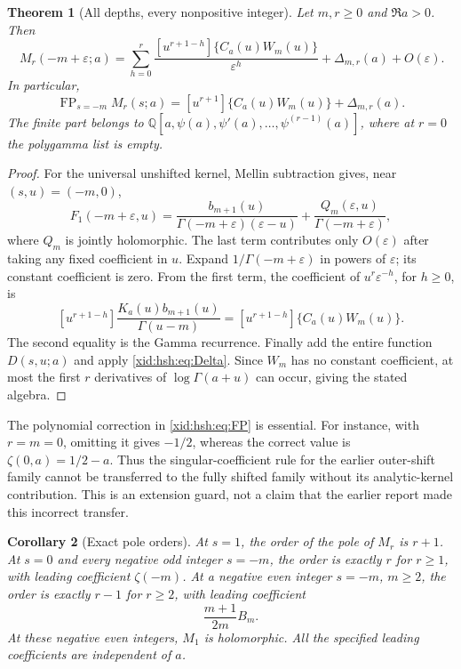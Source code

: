 \documentclass[11pt,a4paper]{article}
\numberwithin{equation}{section}
\newtheorem{theorem}{Theorem}[section]
\newtheorem{corollary}[theorem]{Corollary}
\theoremstyle{definition}
\theoremstyle{remark}
\begin{document}
\begin{theorem}[All depths, every nonpositive integer]
\label{xid:hsh:thm:Laurent}
Let $m,r\ge0$ and $\Re a>0$. Then
\begin{equation}\label{xid:hsh:eq:Laurent}
 \boxed{\quad
 M_r(-m+\varepsilon;a)=
 \sum_{h=0}^r
     \frac{[u^{r+1-h}]\{C_a(u)W_m(u)\}}{\varepsilon^h}
   +\Delta_{m,r}(a)+O(\varepsilon).
 \quad}
\end{equation}
In particular,
\begin{equation}\label{xid:hsh:eq:FP}
 \operatorname{FP}_{s=-m}M_r(s;a)
  =[u^{r+1}]\{C_a(u)W_m(u)\}+\Delta_{m,r}(a).
\end{equation}
The finite part belongs to
$\mathbb Q[a,\psi(a),\psi'(a),\ldots,\psi^{(r-1)}(a)]$,
where at $r=0$ the polygamma list is empty.
\end{theorem}

\begin{proof}
For the universal unshifted kernel, Mellin subtraction gives, near
$(s,u)=(-m,0)$,
\[
 F_1(-m+\varepsilon,u)
 =\frac{b_{m+1}(u)}{\Gamma(-m+\varepsilon)(\varepsilon-u)}
       +\frac{Q_m(\varepsilon,u)}{\Gamma(-m+\varepsilon)},
\]
where $Q_m$ is jointly holomorphic. The last term contributes only
$O(\varepsilon)$ after taking any fixed coefficient in $u$.
Expand $1/\Gamma(-m+\varepsilon)$ in powers of $\varepsilon$;
its constant coefficient is zero. From the first term, the coefficient
of $u^r\varepsilon^{-h}$, for $h\ge0$, is
\[
 [u^{r+1-h}]\frac{K_a(u)b_{m+1}(u)}{\Gamma(u-m)}
   =[u^{r+1-h}]\{C_a(u)W_m(u)\}.
\]
The second equality is the Gamma recurrence. Finally add the entire
function $D(s,u;a)$ and apply \eqref{xid:hsh:eq:Delta}. Since $W_m$ has
no constant coefficient, at most the first $r$ derivatives of
$\log\Gamma(a+u)$ can occur, giving the stated algebra.
\end{proof}

The polynomial correction in \eqref{xid:hsh:eq:FP} is essential. For instance,
with $r=m=0$, omitting it gives $-1/2$, whereas the correct value is
$\zeta(0,a)=1/2-a$. Thus the singular-coefficient rule for the earlier
outer-shift family cannot be transferred to the fully shifted family
without its analytic-kernel contribution. This is an extension guard,
not a claim that the earlier report made this incorrect transfer.

\begin{corollary}[Exact pole orders]
\label{xid:hsh:cor:poles}
At $s=1$, the order of the pole of $M_r$ is $r+1$.
At $s=0$ and every negative odd integer $s=-m$, the order is exactly $r$
for $r\ge1$, with leading coefficient $\zeta(-m)$.
At a negative even integer $s=-m$, $m\ge2$, the order is exactly $r-1$
for $r\ge2$, with leading coefficient
\begin{equation}\label{xid:hsh:eq:evenleading}
 \frac{m+1}{2m}B_m.
\end{equation}
At these negative even integers, $M_1$ is holomorphic.
All the specified leading coefficients are independent of $a$.
\end{corollary}
\end{document}
